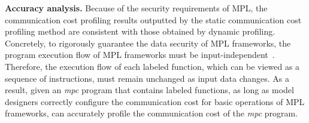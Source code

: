 \noindent\textbf{Accuracy analysis.} Because of the security requirements of MPL, the communication cost profiling results outputted by the static communication cost profiling method are consistent with those obtained by dynamic profiling. Concretely, to rigorously guarantee the data security of MPL frameworks, the program execution flow of MPL frameworks must be input-independent~\cite{10.1145/28395.28416}. Therefore, the execution flow of each labeled function, which can be viewed as a sequence of instructions, must remain unchanged as input data changes. As a result, given an \textit{mpc} program that contains labeled functions, as long as model designers correctly configure the communication cost for basic operations of MPL frameworks, \hawkeye can accurately profile the communication cost of the \textit{mpc} program.

